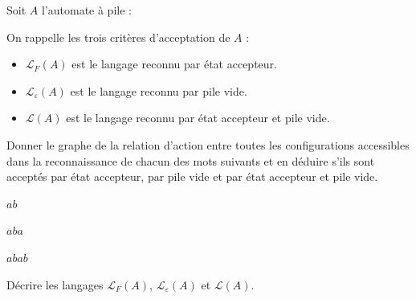 
\begingroup

\begin{exercice}\label{exo:parsing/decision/pushdown_definitions}

  Soit $A$ l'automate à pile : 

  On rappelle les trois critères d'acceptation de $A$ : 
  \begin{itemize}
  \item $\mathcal{L}_F(A)$ est le langage reconnu par état accepteur.
  \item $\mathcal{L}_\varepsilon(A)$ est le langage reconnu par pile vide.
  \item $\mathcal{L}(A)$ est le langage reconnu par état accepteur et pile vide.
  \end{itemize}

  Donner le graphe de la relation d'action entre toutes les configurations accessibles
  dans la reconnaissance de chacun des mots suivants et en déduire s'ils sont acceptés
  par état accepteur, par pile vide et par état accepteur et pile vide.
  \begin{questions}
  \item $ab$
  \item $aba$
  \item $abab$
  \item Décrire les langages $\mathcal{L}_F(A)$, $\mathcal{L}_\varepsilon(A)$ et $\mathcal{L}(A)$.
  \end{questions}

\end{exercice}

